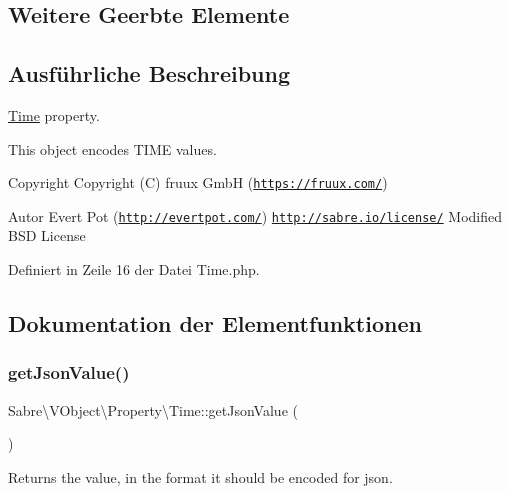 \subsection*{Weitere Geerbte Elemente}


\subsection{Ausführliche Beschreibung}
\mbox{\hyperlink{class_sabre_1_1_v_object_1_1_property_1_1_time}{Time}} property.

This object encodes T\+I\+ME values.

\begin{DoxyCopyright}{Copyright}
Copyright (C) fruux GmbH (\href{https://fruux.com/}{\tt https\+://fruux.\+com/}) 
\end{DoxyCopyright}
\begin{DoxyAuthor}{Autor}
Evert Pot (\href{http://evertpot.com/}{\tt http\+://evertpot.\+com/})  \href{http://sabre.io/license/}{\tt http\+://sabre.\+io/license/} Modified B\+SD License 
\end{DoxyAuthor}


Definiert in Zeile 16 der Datei Time.\+php.



\subsection{Dokumentation der Elementfunktionen}
\mbox{\label{class_sabre_1_1_v_object_1_1_property_1_1_time_ab6173ff40dbb5bf1f0a55c62b1c3a5ac}} 
\subsubsection{\texorpdfstring{get\+Json\+Value()}{getJsonValue()}}
{\footnotesize\ttfamily Sabre\textbackslash{}\+V\+Object\textbackslash{}\+Property\textbackslash{}\+Time\+::get\+Json\+Value (\begin{DoxyParamCaption}{ }\end{DoxyParamCaption})}

Returns the value, in the format it should be encoded for json.

